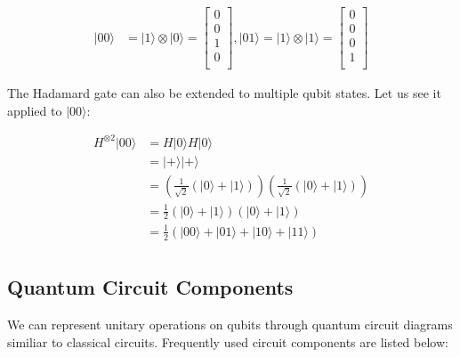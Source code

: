 \documentclass[msc,oneside]{ubcthesis}
\begin{document}
	\begin{align*}	
		|00\rangle &= |1\rangle \otimes |0\rangle = \begin{bmatrix}
			0 \\
			0 \\
			1 \\
			0 \\
		\end{bmatrix}, 
		|01\rangle = |1\rangle \otimes |1\rangle = \begin{bmatrix}
			0 \\
			0 \\
			0 \\
			1 \\
		\end{bmatrix}		
	\end{align*}
	
 The Hadamard gate can also be extended to multiple qubit states. Let us see it applied to $|00\rangle$:
	
	\begin{align*}	
		H^{\otimes 2}|00\rangle &= H|0\rangle H|0\rangle\\
		&= |+\rangle|+\rangle\\
		&= (\frac{1}{\sqrt{2}} (|0\rangle + |1\rangle))(\frac{1}{\sqrt{2}} (|0\rangle + |1\rangle))\\
		&= \frac{1}{2} (|0\rangle + |1\rangle)(|0\rangle + |1\rangle)\\
		&= \frac{1}{2} (|00\rangle + |01\rangle + |10\rangle + |11\rangle)\\
	\end{align*}
	
	\subsection{Quantum Circuit Components}
	
	We can represent unitary operations on qubits through quantum circuit diagrams similiar to classical circuits. Frequently used circuit components are listed below:
	
\end{document}
